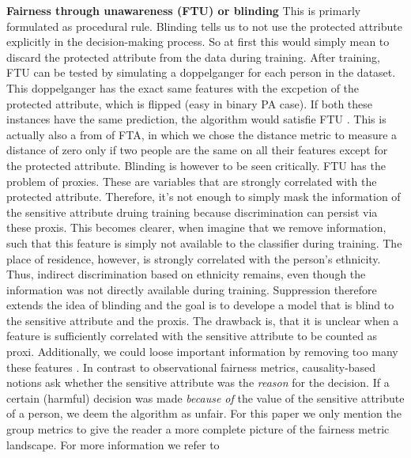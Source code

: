 \textbf{Fairness through unawareness (FTU) or blinding}
This is primarly formulated as procedural rule. Blinding tells us to not use the protected attribute explicitly in the decision-making process. So at first this would simply mean to discard the protected attribute from the data during training. After training, FTU can be tested by simulating a doppelganger for each person in the dataset. This doppelganger has the exact same features with the excpetion of the protected attribute, which is flipped (easy in binary PA case). If both these instances have the same prediction, the algorithm would satisfie FTU \cite{verma2018}. This is actually also a from of FTA, in which we chose the distance metric to measure a distance of zero only if two people are the same on all their features except for the protected attribute. Blinding is however to be seen critically.
FTU has the problem of proxies. These are variables that are strongly correlated with the protected attribute. Therefore, it's not enough to simply mask the information of the sensitive attribute druing training because discrimination can persist via these proxis. This becomes clearer, when imagine that we remove information, such that this feature is simply not available to the classifier during training. The place of residence, however, is strongly correlated with the person's ethnicity. Thus, indirect discrimination based on ethnicity remains, even though the information was not directly available during training. Suppression therefore extends the idea of blinding and the goal is to develope a model that is blind to the sensitive attribute and the proxis. The drawback is, that it is unclear when a feature is sufficiently correlated with the sensitive attribute to be counted as proxi. Additionally, we could loose important information by removing too many these features \cite{castelnovo2022}.
In contrast to observational fairness metrics, causality-based notions ask whether the sensitive attribute was the \textit{reason} for the decision. If a certain (harmful) decision was made \textit{because of} the value of the sensitive attribute of a person, we deem the algorithm as unfair.
For this paper we only mention the group metrics to give the reader a more complete picture of the fairness metric landscape. For more information we refer to \cite{kusner}

